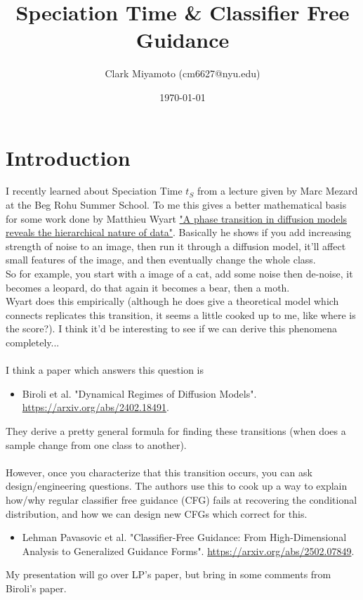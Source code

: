 \documentclass[12pt,fleqn]{article}
\title{Speciation Time \& Classifier Free Guidance}
\author{Clark Miyamoto (cm6627@nyu.edu)}
\date{\today}
\numberwithin{equation}{section} %
\begin{document}
\maketitle

\tableofcontents

\section{Introduction}
I recently learned about Speciation Time $t_S$ from a lecture given by Marc Mezard at the Beg Rohu Summer School. To me this gives a better mathematical basis for some work done by Matthieu Wyart \href{https://www.pnas.org/doi/full/10.1073/pnas.2408799121}{"A phase transition in diffusion models reveals the hierarchical nature of data"}. Basically he shows if you add increasing strength of noise to an image, then run it through a diffusion model, it'll affect small features of the image, and then eventually change the whole class.\\

So for example, you start with a image of a cat, add some noise then de-noise, it becomes a leopard, do that again it becomes a bear, then a moth. 
\\

Wyart does this empirically (although he does give a theoretical model which connects replicates this transition, it seems a little cooked up to me, like where is the score?). I think it'd be interesting to see if we can derive this phenomena completely...\\
\\
I think a paper which answers this question is
\begin{itemize}
	\item Biroli et al. "Dynamical Regimes of Diffusion Models". \url{https://arxiv.org/abs/2402.18491}.
\end{itemize}
They derive a pretty general formula for finding these transitions (when does a sample change from one class to another).\\
\\
However, once you characterize that this transition occurs, you can ask design/engineering questions. The authors use this to cook up a way to explain how/why regular classifier free guidance (CFG) fails at recovering the conditional distribution, and how we can design new CFGs which correct for this.
\begin{itemize}
	\item Lehman Pavasovic et al. "Classifier-Free Guidance: From High-Dimensional Analysis to Generalized Guidance Forms". \url{https://arxiv.org/abs/2502.07849}.
\end{itemize}
My presentation will go over LP's paper, but bring in some comments from Biroli's paper.
\end{document}
